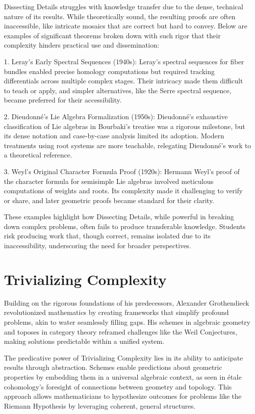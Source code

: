 \documentclass{article}
\begin{document}
Dissecting Details struggles with knowledge transfer due to the dense, technical nature of its results. While theoretically sound, the resulting proofs are often inaccessible, like intricate mosaics that are correct but hard to convey. Below are examples of significant theorems broken down with such rigor that their complexity hinders practical use and dissemination:

1. Leray’s Early Spectral Sequences (1940s): Leray’s spectral sequences for fiber bundles enabled precise homology computations but required tracking differentials across multiple complex stages. Their intricacy made them difficult to teach or apply, and simpler alternatives, like the Serre spectral sequence, became preferred for their accessibility.

2. Dieudonné’s Lie Algebra Formalization (1950s): Dieudonné’s exhaustive classification of Lie algebras in Bourbaki’s treatise was a rigorous milestone, but its dense notation and case-by-case analysis limited its adoption. Modern treatments using root systems are more teachable, relegating Dieudonné’s work to a theoretical reference.

3. Weyl’s Original Character Formula Proof (1920s): Hermann Weyl’s proof of the character formula for semisimple Lie algebras involved meticulous computations of weights and roots. Its complexity made it challenging to verify or share, and later geometric proofs became standard for their clarity.

These examples highlight how Dissecting Details, while powerful in breaking down complex problems, often fails to produce transferable knowledge. Students risk producing work that, though correct, remains isolated due to its inaccessibility, underscoring the need for broader perspectives.

\section{Trivializing Complexity}
Building on the rigorous foundations of his predecessors, Alexander Grothendieck revolutionized mathematics by creating frameworks that simplify profound problems, akin to water seamlessly filling gaps. His schemes in algebraic geometry and toposes in category theory reframed challenges like the Weil Conjectures, making solutions predictable within a unified system.

The predicative power of Trivializing Complexity lies in its ability to anticipate results through abstraction. Schemes enable predictions about geometric properties by embedding them in a universal algebraic context, as seen in étale cohomology’s foresight of connections between geometry and topology. This approach allows mathematicians to hypothesize outcomes for problems like the Riemann Hypothesis by leveraging coherent, general structures.
\end{document}
